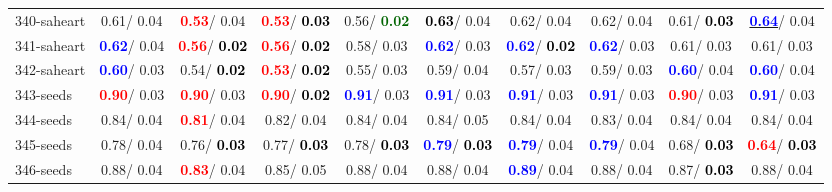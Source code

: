 \begin{table}[h]
\begin{center}
{\begin{tabular}{lc|c|c|c|c|c|c|c|c}
340-saheart &   0.61/  0.04 & \textcolor{red}{\textbf{  0.53}}/  0.04 & \textcolor{red}{\textbf{  0.53}}/\textcolor{black}{\textbf{  0.03}} &   0.56/\textcolor{darkgreen}{\textbf{  0.02}} & \textcolor{black}{\textbf{  0.63}}/  0.04 &   0.62/  0.04 &   0.62/  0.04 &   0.61/\textcolor{black}{\textbf{  0.03}} & \underline{\textcolor{blue}{\textbf{  0.64}}}/  0.04 \\
341-saheart & \textcolor{blue}{\textbf{  0.62}}/  0.04 & \textcolor{red}{\textbf{  0.56}}/\textcolor{black}{\textbf{  0.02}} & \textcolor{red}{\textbf{  0.56}}/\textcolor{black}{\textbf{  0.02}} &   0.58/  0.03 & \textcolor{blue}{\textbf{  0.62}}/  0.03 & \textcolor{blue}{\textbf{  0.62}}/\textcolor{black}{\textbf{  0.02}} & \textcolor{blue}{\textbf{  0.62}}/  0.03 &   0.61/  0.03 &   0.61/  0.03 \\ \hline
342-saheart & \textcolor{blue}{\textbf{  0.60}}/  0.03 &   0.54/\textcolor{black}{\textbf{  0.02}} & \textcolor{red}{\textbf{  0.53}}/\textcolor{black}{\textbf{  0.02}} &   0.55/  0.03 &   0.59/  0.04 &   0.57/  0.03 &   0.59/  0.03 & \textcolor{blue}{\textbf{  0.60}}/  0.04 & \textcolor{blue}{\textbf{  0.60}}/  0.04 \\
343-seeds & \textcolor{red}{\textbf{  0.90}}/  0.03 & \textcolor{red}{\textbf{  0.90}}/  0.03 & \textcolor{red}{\textbf{  0.90}}/\textcolor{black}{\textbf{  0.02}} & \textcolor{blue}{\textbf{  0.91}}/  0.03 & \textcolor{blue}{\textbf{  0.91}}/  0.03 & \textcolor{blue}{\textbf{  0.91}}/  0.03 & \textcolor{blue}{\textbf{  0.91}}/  0.03 & \textcolor{red}{\textbf{  0.90}}/  0.03 & \textcolor{blue}{\textbf{  0.91}}/  0.03 \\
344-seeds &   0.84/  0.04 & \textcolor{red}{\textbf{  0.81}}/  0.04 &   0.82/  0.04 &   0.84/  0.04 &   0.84/  0.05 &   0.84/  0.04 &   0.83/  0.04 &   0.84/  0.04 &   0.84/  0.04 \\
345-seeds &   0.78/  0.04 &   0.76/\textcolor{black}{\textbf{  0.03}} &   0.77/\textcolor{black}{\textbf{  0.03}} &   0.78/\textcolor{black}{\textbf{  0.03}} & \textcolor{blue}{\textbf{  0.79}}/\textcolor{black}{\textbf{  0.03}} & \textcolor{blue}{\textbf{  0.79}}/  0.04 & \textcolor{blue}{\textbf{  0.79}}/  0.04 &   0.68/\textcolor{black}{\textbf{  0.03}} & \textcolor{red}{\textbf{  0.64}}/\textcolor{black}{\textbf{  0.03}} \\
346-seeds &   0.88/  0.04 & \textcolor{red}{\textbf{  0.83}}/  0.04 &   0.85/  0.05 &   0.88/  0.04 &   0.88/  0.04 & \textcolor{blue}{\textbf{  0.89}}/  0.04 &   0.88/  0.04 &   0.87/\textcolor{black}{\textbf{  0.03}} &   0.88/  0.04 \\

\end{tabular}}
\end{center}
\end{table}
